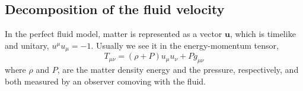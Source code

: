 \subsection{Decomposition of the fluid velocity}

In the perfect fluid model, matter is represented as a vector $\mathbf{u}$, which is timelike and unitary, $u^\mu u_\mu = -1$. Usually we see it in the energy-momentum tensor,
\begin{equation}
    T_{\mu\nu}=(\rho+P)u_\mu u_\nu + P g_{\mu\nu}
    \label{eqn:fluid_decomposition_energy_tensor}
\end{equation}
where $\rho$ and $P$, are the matter density energy and the pressure, respectively, and both measured by an observer comoving with the fluid.

\begin{figure}[h]
    \centering
    \begin{center}

\begin{tikzpicture}[x=0.75pt,y=0.75pt,yscale=-1,xscale=1]


\end{tikzpicture}
\end{center}
\end{figure}
